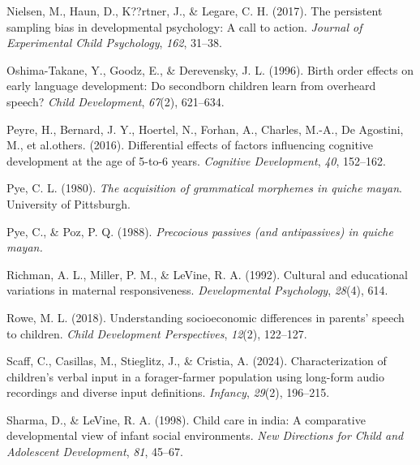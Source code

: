 \documentclass[
  man,floatsintext]{apa6}
\newlength{\cslhangindent}
\newlength{\cslentryspacingunit} %
\newenvironment{CSLReferences}[2] %
 {%
  \setlength{\parindent}{0pt}
  \ifodd #1
  \let\oldpar\par
  \def\par{\hangindent=\cslhangindent\oldpar}
  \fi
  \setlength{\parskip}{#2\cslentryspacingunit}
 }%
 {}
\begin{document}
\begin{CSLReferences}{1}{0}
\leavevmode{}%
Nielsen, M., Haun, D., K??rtner, J., \& Legare, C. H. (2017). The persistent sampling bias in developmental psychology: A call to action. \emph{Journal of Experimental Child Psychology}, \emph{162}, 31--38.

\leavevmode{}%
Oshima-Takane, Y., Goodz, E., \& Derevensky, J. L. (1996). Birth order effects on early language development: Do secondborn children learn from overheard speech? \emph{Child Development}, \emph{67}(2), 621--634.

\leavevmode{}%
Peyre, H., Bernard, J. Y., Hoertel, N., Forhan, A., Charles, M.-A., De Agostini, M., et al.others. (2016). Differential effects of factors influencing cognitive development at the age of 5-to-6 years. \emph{Cognitive Development}, \emph{40}, 152--162.

\leavevmode{}%
Pye, C. L. (1980). \emph{The acquisition of grammatical morphemes in quiche mayan}. University of Pittsburgh.

\leavevmode{}%
Pye, C., \& Poz, P. Q. (1988). \emph{Precocious passives (and antipassives) in quiche mayan.}

\leavevmode{}%
Richman, A. L., Miller, P. M., \& LeVine, R. A. (1992). Cultural and educational variations in maternal responsiveness. \emph{Developmental Psychology}, \emph{28}(4), 614.

\leavevmode{}%
Rowe, M. L. (2018). Understanding socioeconomic differences in parents' speech to children. \emph{Child Development Perspectives}, \emph{12}(2), 122--127.

\leavevmode{}%
Scaff, C., Casillas, M., Stieglitz, J., \& Cristia, A. (2024). Characterization of children's verbal input in a forager-farmer population using long-form audio recordings and diverse input definitions. \emph{Infancy}, \emph{29}(2), 196--215.

\leavevmode{}%
Sharma, D., \& LeVine, R. A. (1998). Child care in india: A comparative developmental view of infant social environments. \emph{New Directions for Child and Adolescent Development}, \emph{81}, 45--67.


\end{CSLReferences}
\end{document}
